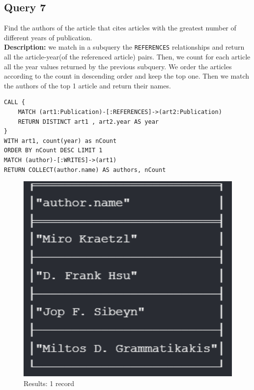 \documentclass{Configuration_Files/PoliMi3i_thesis}
\begin{document}
\subsection{Query 7}
Find the authors of the article that cites articles with the greatest number of different years of publication.\\
\textbf{Description:} we match in a subquery the \verb |REFERENCES| relationships and return all the article-year(of the
referenced article) pairs. Then, we count for each article all the year values returned by the previous subquery. We
order the articles according to the count in descending order and keep the top one. Then we match the authors of the top
1 article and return their names.
\begin{lstlisting}[language=cypher, label=lst:cypher-example]
CALL {
    MATCH (art1:Publication)-[:REFERENCES]->(art2:Publication)
    RETURN DISTINCT art1 , art2.year AS year
}
WITH art1, count(year) as nCount
ORDER BY nCount DESC LIMIT 1
MATCH (author)-[:WRITES]->(art1)
RETURN COLLECT(author.name) AS authors, nCount
\end{lstlisting}
\begin{figure}[H]
\centering
\includegraphics[width=1\textwidth]{query/query7.PNG}
\caption{Results: 1 record}
\label{fig:query7}
\end{figure}
\end{document}
